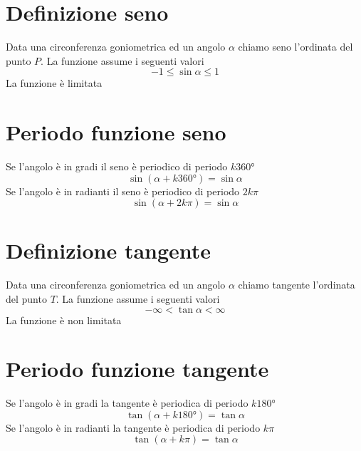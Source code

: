\section{Definizione seno}
Data una circonferenza goniometrica ed un angolo $\alpha$ chiamo seno l'ordinata del punto $P$. La funzione assume i seguenti valori
\begin{equation*}
-1\leq \sin\alpha \leq 1
\end{equation*}
La funzione è limitata
\begin{center}
	
\end{center}
\section{Periodo funzione seno}
Se l'angolo è in gradi il seno è periodico di periodo $k\ang{360}$
\begin{equation*}
\sin(\alpha+k\ang{360;;})=\sin\alpha
\end{equation*}
Se l'angolo è in radianti il seno è periodico di periodo $2k\pi$
\begin{equation*}
\sin(\alpha+2k\pi)=\sin\alpha
\end{equation*}
\section{Definizione tangente}
Data una circonferenza goniometrica ed un angolo $\alpha$ chiamo tangente l'ordinata del punto $T$.
La funzione assume i seguenti valori
\begin{equation*}
-\infty<\tan\alpha< \infty
\end{equation*}
La funzione è non limitata
\begin{center}
	
\end{center}
\section{Periodo funzione tangente}
Se l'angolo è in gradi la tangente è periodica di periodo $k\ang{180}$
\begin{equation*}
\tan(\alpha+k\ang{180;;})=\tan\alpha
\end{equation*}
Se l'angolo è in radianti la tangente è periodica di periodo $k\pi$
\begin{equation*}
\tan(\alpha+k\pi)=\tan\alpha
\end{equation*}
